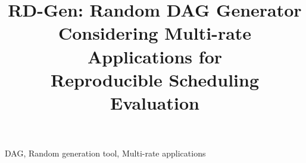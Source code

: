 \documentclass[conference]{IEEEtran}
\newcommand{\todo}[1]{\hl{\textbf{TODO:} #1}}
\begin{document}
\title{RD-Gen: Random DAG Generator \\ Considering Multi-rate Applications for \\ Reproducible Scheduling Evaluation}
\maketitle

\author{
}



\begin{IEEEkeywords}
    DAG, Random generation tool, Multi-rate applications
\end{IEEEkeywords}

















\end{document}
